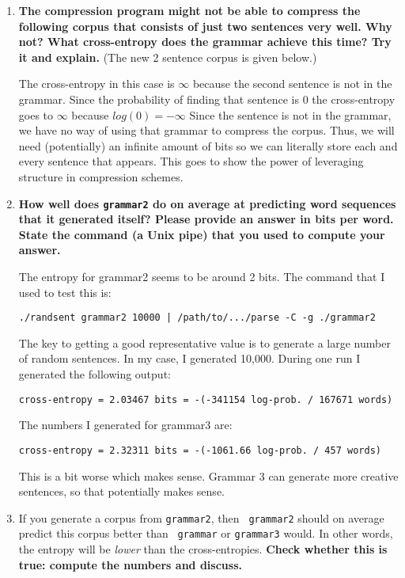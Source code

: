 \documentclass[10pt]{article}
\begin{document}
\begin{enumerate}
\begin{enumerate}
\begin{enumerate}
\item {\bf The compression program might not be able to compress the
    following corpus that consists of just two sentences very well.
    Why not? What cross-entropy does the grammar achieve this time?
    Try it and explain.}  (The new 2 sentence corpus is given below.)

The cross-entropy in this case is $\infty$ because the second sentence is not in the grammar. Since the probability of finding that sentence is 0 the cross-entropy goes to $\infty$ because $log(0) = - \infty$ Since the sentence is not in the grammar, we have no way of using that grammar to compress the corpus. Thus, we will need (potentially) an infinite amount of bits so we can literally store each and every sentence that appears. This goes to show the power of leveraging structure in compression schemes. 

\item {\bf How well does {\tt grammar2} do on average at predicting
    word sequences that it generated itself?  Please provide an answer
    in bits per word.  State the command (a Unix pipe) that you used
    to compute your answer.}

The entropy for grammar2 seems to be around 2 bits. The command that I used to test this is:

{\tt ./randsent grammar2 10000 | /path/to/.../parse -C -g ./grammar2 }

The key to getting a good representative value is to generate a large number of random sentences. In my case, I generated 10,000. During one run I generated the following output:

{\tt cross-entropy = 2.03467 bits = -(-341154 log-prob. / 167671 words)}
 

The numbers I generated for grammar3 are:

{\tt cross-entropy = 2.32311 bits = -(-1061.66 log-prob. / 457 words)}

This is a bit worse which makes sense. Grammar 3 can generate more creative sentences, so that potentially makes sense.



\item If you generate a corpus from {\tt grammar2}, then {\tt
    grammar2} should on average predict this corpus better than {\tt
    grammar} or {\tt grammar3} would. In other words, the entropy will
  be {\it lower} than the cross-entropies. {\bf Check whether this is true:
    compute the numbers and discuss.} 



\end{enumerate}
\end{enumerate}
\end{enumerate}
\end{document}

